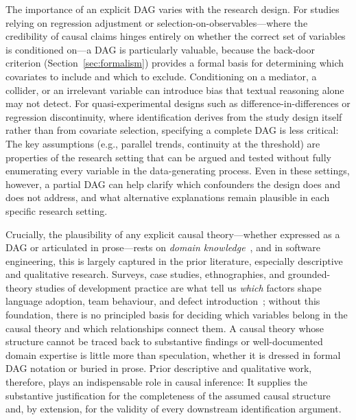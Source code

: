 The importance of an explicit DAG varies with the research design.
For studies relying on regression adjustment or selection-on-observables---where the credibility of causal claims hinges entirely on whether the correct set of variables is conditioned on---a DAG is particularly valuable, because the back-door criterion (Section~\ref{sec:formalism}) provides a formal basis for determining which covariates to include and which to exclude.
Conditioning on a mediator, a collider, or an irrelevant variable can introduce bias that textual reasoning alone may not detect.
For quasi-experimental designs such as difference-in-differences or regression discontinuity, where identification derives from the study design itself rather than from covariate selection, specifying a complete DAG is less critical: The key assumptions (e.g., parallel trends, continuity at the threshold) are properties of the research setting that can be argued and tested without fully enumerating every variable in the data-generating process.
Even in these settings, however, a partial DAG can help clarify which confounders the design does and does not address, and what alternative explanations remain plausible in each specific research setting.

Crucially, the plausibility of any explicit causal theory---whether expressed as a DAG or articulated in prose---rests on \emph{domain knowledge}~\cite{pearl2009causality}, and in software engineering, this is largely captured in the prior literature, especially descriptive and qualitative research.
Surveys, case studies, ethnographies, and grounded-theory studies of development practice are what tell us \emph{which} factors shape language adoption, team behaviour, and defect introduction~\cite{DBLP:conf/icse/Devanbu0B16}; without this foundation, there is no principled basis for deciding which variables belong in the causal theory and which relationships connect them.
A causal theory whose structure cannot be traced back to substantive findings or well-documented domain expertise is little more than speculation, whether it is dressed in formal DAG notation or buried in prose.
Prior descriptive and qualitative work, therefore, plays an indispensable role in causal inference: It supplies the substantive justification for the completeness of the assumed causal structure and, by extension, for the validity of every downstream identification argument.

